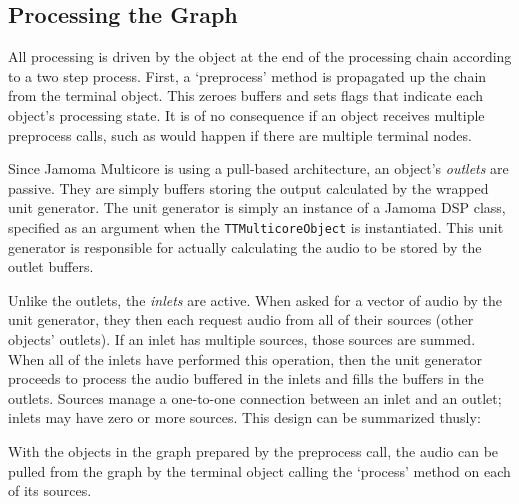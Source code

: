 \documentclass[twoside,a4paper]{article}
\begin{document}


\subsection{Processing the Graph} %

All processing is driven by the object at the end of the processing chain according to a two step process.  First, a `preprocess' method is propagated up the chain from the terminal object.  This zeroes buffers and sets flags that indicate each object's processing state.  It is of no consequence if an object receives multiple preprocess calls, such as would happen if there are multiple terminal nodes.

Since Jamoma Multicore is using a pull-based architecture, an object's \emph{outlets} are passive.  They are simply buffers storing the output calculated by the wrapped unit generator.  The unit generator is simply an instance of a Jamoma DSP class, specified as an argument when the \texttt{TTMulticoreObject} is instantiated.  This unit generator is responsible for actually calculating the audio to be stored by the outlet buffers.

Unlike the outlets, the \emph{inlets} are active.  When asked for a vector of audio by the unit generator, they then each request audio from all of their sources (other objects' outlets).  If an inlet has multiple sources, those sources are summed.  When all of the inlets have performed this operation, then the unit generator proceeds to process the audio buffered in the inlets and fills the buffers in the outlets.  Sources manage a one-to-one connection between an inlet and an outlet; inlets may have zero or more sources.  This design can be summarized thusly:

With the objects in the graph prepared by the preprocess call, the audio can be pulled from the graph by the terminal object calling the `process' method on each of its sources.


\end{document}
